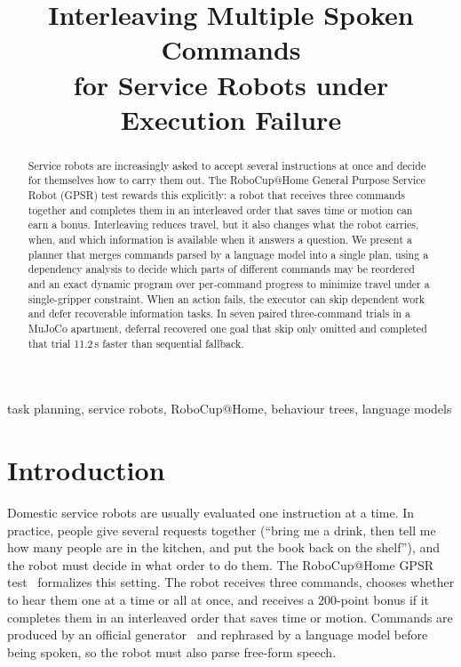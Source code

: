 \documentclass[conference]{IEEEtran}
\newcommand{\todo}[1]{}
\newcommand{\todo}[1]{\textcolor{red}{[TODO: #1]}}
\begin{document}
\title{Interleaving Multiple Spoken Commands\\for Service Robots under Execution Failure}

\author{
\IEEEauthorblockN{\todo{Author 1}, \todo{Author 2}, \todo{Author 3}}
\IEEEauthorblockA{\todo{Affiliation}\\
\todo{email}}
}

\maketitle

\begin{abstract}
Service robots are increasingly asked to accept several instructions at once
and decide for themselves how to carry them out. The RoboCup@Home General
Purpose Service Robot (GPSR) test rewards this explicitly: a robot that
receives three commands together and completes them in an interleaved
order that saves time or motion can earn a bonus. Interleaving reduces travel,
but it also changes what the robot carries, when, and which information is
available when it answers a question.
We present a planner that merges commands parsed by a language model into a
single plan, using a dependency analysis to decide which parts of different
commands may be reordered and an exact dynamic program over per-command
progress to minimize travel under a single-gripper constraint. When an
action fails, the executor can skip dependent work and defer recoverable
information tasks. In seven paired three-command trials in a MuJoCo
apartment, deferral recovered one goal that skip only omitted and
completed that trial 11.2\,s faster than sequential fallback.
\todo{Robot result sentence from RoboCup 2027.}
\end{abstract}

\begin{IEEEkeywords}
task planning, service robots, RoboCup@Home, behaviour trees, language models
\end{IEEEkeywords}

\section{Introduction}

Domestic service robots are usually evaluated one instruction at a time. In
practice, people give several requests together (``bring me a drink, then
tell me how many people are in the kitchen, and put the book back on the
shelf''), and the robot must decide in what order to do them. The
RoboCup@Home GPSR test~\cite{rulebook} formalizes this setting. The robot
receives three commands, chooses whether to hear them one at a time or all at
once, and receives a 200-point bonus if it completes them in an interleaved
order that saves time or motion. Commands are produced by an official
generator~\cite{cmdgen} and rephrased by a language model before being spoken,
so the robot must also parse free-form speech.
\end{document}
